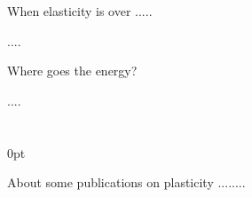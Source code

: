 

\thispagestyle{empty}

\label{chapter:plasticity}



\label{section:elasticityisover}

When elasticity is over .....

....




\label{section:energygoesthere}

Where goes the energy?

....



\section*{\small \wordforbibliography}

\begin{changemargin}{\parindent}{0pt}
\fontsize{10}{12}\selectfont

About some publications on plasticity ........

\end{changemargin}

